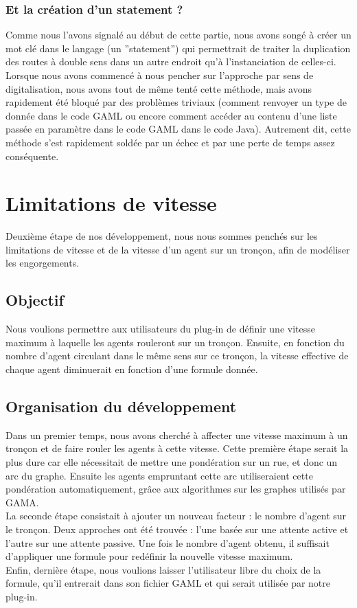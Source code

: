 \documentclass[11pt]{report} %
\begin{document}
\subsection{Et la cr\'eation d'un statement ?}
Comme nous l'avons signal\'e au d\'ebut de cette partie, nous avons song\'e \`a cr\'eer un mot cl\'e dans le langage (un ''statement'') qui permettrait de traiter la duplication des routes \`a double sens dans un autre endroit qu'\`a l'instanciation de celles-ci.\\
Lorsque nous avons commenc\'e \`a nous pencher sur l'approche par sens de digitalisation, nous avons tout de m\^eme tent\'e cette m\'ethode, mais avons rapidement \'et\'e bloqu\'e par des probl\`emes triviaux (comment renvoyer un type de donn\'ee dans le code GAML ou encore comment acc\'eder au contenu d'une liste pass\'ee en param\`etre dans le code GAML dans le code Java). Autrement dit, cette m\'ethode s'est rapidement sold\'ee par un \'echec et par une perte de temps assez cons\'equente.

\chapter{Limitations de vitesse}
Deuxi\`eme \'etape de nos d\'eveloppement, nous nous sommes pench\'es sur les limitations de vitesse et de la vitesse d'un agent sur un tronçon, afin de mod\'eliser les engorgements.

\section{Objectif}
Nous voulions permettre aux utilisateurs du plug-in de d\'efinir une vitesse maximum \`a laquelle les agents rouleront sur un tronçon. Ensuite, en fonction du nombre d'agent circulant dans le m\^eme sens sur ce tronçon, la vitesse effective de chaque agent diminuerait en fonction d'une formule donn\'ee.

\section{Organisation du d\'eveloppement}
Dans un premier temps, nous avons cherch\'e \`a affecter une vitesse maximum \`a un tronçon et de faire rouler les agents \`a cette vitesse. Cette premi\`ere \'etape serait la plus dure car elle n\'ecessitait de mettre une pond\'eration sur un rue, et donc un arc du graphe. Ensuite les agents empruntant cette arc utiliseraient cette pond\'eration automatiquement, grâce aux algorithmes sur les graphes utilis\'es par GAMA.\\
La seconde \'etape consistait \`a ajouter un nouveau facteur : le nombre d'agent sur le tronçon. Deux approches ont \'et\'e trouv\'ee : l'une bas\'ee sur une attente active et l'autre sur une attente passive. Une fois le nombre d'agent obtenu, il suffisait d'appliquer une formule pour red\'efinir la nouvelle vitesse maximum.\\
Enfin, derni\`ere \'etape, nous voulions laisser l'utilisateur libre du choix de la formule, qu'il entrerait dans son fichier GAML et qui serait utilis\'ee par notre plug-in.
\end{document}
